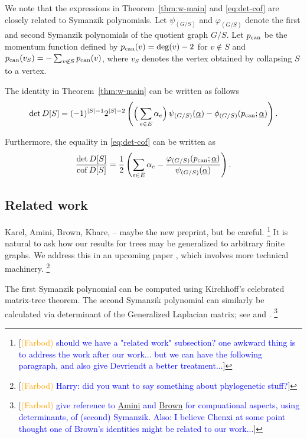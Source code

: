 \documentclass[12pt]{amsart}
\theoremstyle{definition}
\DeclareMathOperator{\cof}{cof}
\newcommand\farbod[1]{\footnote{[\textcolor{orange}{(Farbod)} \textcolor{blue}{#1}]}}
\begin{document}
We note that the expressions in Theorem~\ref{thm:w-main} and \eqref{eq:det-cof} are closely related to Symanzik polynomials.
Let $\psi_{(G/S)}$ and $\varphi_{(G/S)}$ denote the first and second Symanzik polynomials of the quotient graph $G/S$.
Let $p_{\rm can}$ be the momentum function defined by $p_{\rm can}(v) = \deg(v) - 2$ for $v \not \in S$ and $p_{\rm can}(v_S) = -\sum_{v \not\in S} p_{\rm can}(v)$, where $v_S$ denotes the vertex obtained by collapsing $S$ to a vertex.

The identity in Theorem~\ref{thm:w-main} can be written as follows
\begin{equation}
\label{eq:det-symanzik}
	\det D[S] = (-1)^{|S|-1} 2^{|S|-2} \left( \Big(\sum_{e \in E}\alpha_e \Big)\, \psi_{(G/S)}(\underline{\alpha}) - \phi_{(G/S)}(p_{\rm can}; \underline{\alpha}) \right) .
\end{equation}

Furthermore, the equality in \eqref{eq:det-cof} can be written as
\begin{equation}
\label{eq:det-cof-symanzik}
	\frac{\det D[S]}{\cof D[S]} = \frac12 \left( \sum_{e \in E} \alpha_e - \frac{\varphi_{(G/S)}(p_{\rm can}; \underline{\alpha})}{\psi_{(G/S)}(\underline{\alpha})} \right) .
      \end{equation}

\subsection{Related work}
Karel, Amini, Brown, Khare, -- maybe the new preprint, but be careful.
\farbod{should we have a "related work" subsection? one awkward thing is to address the work after our work... but  we can have the following paragraph, and also give Devriendt a better treatment...}
It is natural to ask how our results for trees may be generalized to arbitrary finite graphs. We address this in an upcoming paper \cite{richman-shokrieh-wu}, which involves more technical machinery.
\farbod{Harry: did you want to say something about phylogenetic stuff?}

The first Symanzik polynomial can be computed using Kirchhoff's celebrated matrix-tree theorem.
The second Symanzik polynomial can similarly be calculated via determinant of the Generalized Laplacian matrix; see 
\cite[Section 1.1]{amini} and \cite[Theorem 7.1]{brown}.
\farbod{give reference to \href{https://ems.press/journals/aihpd/articles/16097}{Amini} \cite{amini} and \href{https://link.springer.com/article/10.1007/s00220-023-04879-3}{Brown} \cite{brown} for compuational aspects, using determinants, of (second) Symanzik. Also: I believe Chenxi at some point thought one of Brown's identities might be related to our work...}
\end{document}
